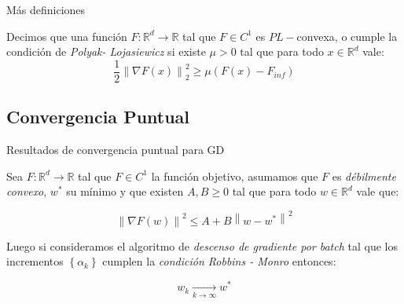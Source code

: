 \documentclass{beamer}
\newcommand{\R}{{\mathbb{R}}}
\newcommand{\norm}[1]{\left\lVert#1\right\rVert}
\newcommand{\sett}[1]{\left\lbrace#1\right\rbrace}
\newcommand{\underlimitinf}[1]{\xrightarrow[#1 \rightarrow \infty]{}}
\begin{document}
\begin{frame}{M\'as definiciones}

\begin{definition}
	Decimos que una funci\'on $F:\R^d \rightarrow \R$ tal que $F \in C^1$ es $PL-$convexa, o cumple la condici\'on de \textit{Polyak- Lojasiewicz} \nocite{polyak:1963} \nocite{lojasiewicz:1963} si existe $\mu >0$ tal que para todo $x \in \R^d$ vale:
	\begin{equation*}
	\frac{1}{2} \norm{\nabla F(x)}^2_2 \geq \mu \left(F(x) - F_{inf}\right)
	\end{equation*}
\end{definition}

\end{frame}

\subsection{Convergencia Puntual}

\begin{frame}{Resultados de convergencia puntual para GD}

\begin{theorem}
	Sea $F: \R^d \rightarrow \R$ tal que $F \in C^1$ la funci\'on objetivo, asumamos que $F$ es \textit{d\'ebilmente convexo}, $w^*$ su m\'inimo y que existen $A,B \geq 0$ tal que para todo $w \in \R^d$ vale que:
	
	\begin{equation*}
	\norm{\nabla F(w)}^2 \leq A + B \norm{w - w^*}^2
	\end{equation*}
	
	Luego si consideramos el algoritmo de \textit{descenso de gradiente por batch} tal que los incrementos $\sett{\alpha_k}$  cumplen la \textit{condici\'on Robbins - Monro} entonces:
	
	\begin{equation*}
	w_k \underlimitinf{k} w^*
	\end{equation*}
	
\end{theorem}

\end{frame}
\end{document}
